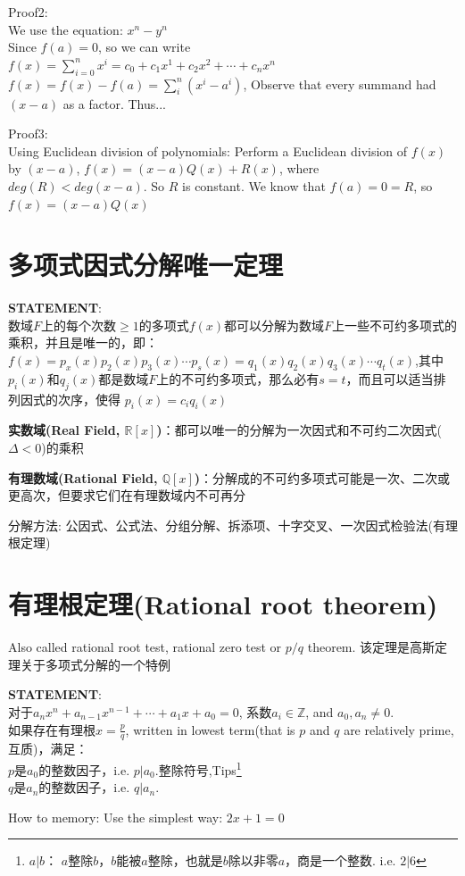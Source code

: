 \documentclass[../main.tex]{subfiles}
\begin{document}
Proof2:\\
We use the equation: $x^n-y^n$\\
Since $f(a)=0$, so we can write $f(x)=\sum_{i=0}^nx^i=c_0+c_1x^1+c_2x^2+\cdots +c_nx^n$\\
$f(x)=f(x)-f(a)=\sum_i^n(x^i-a^i)$, Observe that every summand had $(x-a)$ as a factor. Thus...

Proof3:\\
Using Euclidean division of polynomials: Perform a Euclidean division of $f(x)$ by $(x-a)$, $f(x)=(x-a)Q(x)+R(x)$, where $deg(R) < deg(x-a)$. So $R$ is constant. We know that $f(a)=0=R$, so $f(x)=(x-a)Q(x)$

\section{多项式因式分解唯一定理}
\begin{mdframed}
  \textbf{STATEMENT}:\\
  数域$F$上的每个次数$\ge 1$的多项式$f(x)$都可以分解为数域$F$上一些不可约多项式的乘积，并且是唯一的，即：\\
  $f(x)=p_{x}(x)p_2(x)p_3(x)\cdots p_{s}(x) = q_1(x)q_2(x)q_3(x)\cdots q_{t}(x)$,其中$p_{i}(x)$和$q_{j}(x)$都是数域$F$上的不可约多项式，那么必有$s=t$，而且可以适当排列因式的次序，使得
  $p_{i}(x)=c_{i}q_{i}(x)$
\end{mdframed}

\textbf{实数域(Real Field, $\mathbb{R}[x]$)}：都可以唯一的分解为一次因式和不可约二次因式($\Delta <0$)的乘积

\textbf{有理数域(Rational Field, $\mathbb{Q}[x]$)}：分解成的不可约多项式可能是一次、二次或更高次，但要求它们在有理数域内不可再分

分解方法: 公因式、公式法、分组分解、拆添项、十字交叉、一次因式检验法(有理根定理)

\section{有理根定理(Rational root theorem)}
Also called rational root test, rational zero test or $p/q$ theorem. 该定理是高斯定理关于多项式分解的一个特例

\begin{mdframed}
  \textbf{STATEMENT}:\\
  对于$a_{n}x^{n} + a_{n-1}x^{n-1}+\cdots + a_1x+a_{0}=0$, \colorbox{BurntOrange}{系数$a_{i}\in \mathbb{Z}$, and $a_{0}, a_{n} \neq 0$.}\\
  如果存在有理根$x=\frac{p}{q}$, written in lowest term(that is $p$ and $q$ are relatively prime, 互质)，满足：\\
  $p$是$a_{0}$的整数因子，i.e. $p|a_{0}$.整除符号,Tips\footnote{$a|b$： $a$整除$b$，$b$能被$a$整除，也就是$b$除以非零$a$，商是一个整数. i.e. $2|6$}\\
  $q$是$a_{n}$的整数因子，i.e. $q|a_{n}$.
\end{mdframed}
How to memory: Use the simplest way: $2x+1=0$
\end{document}
